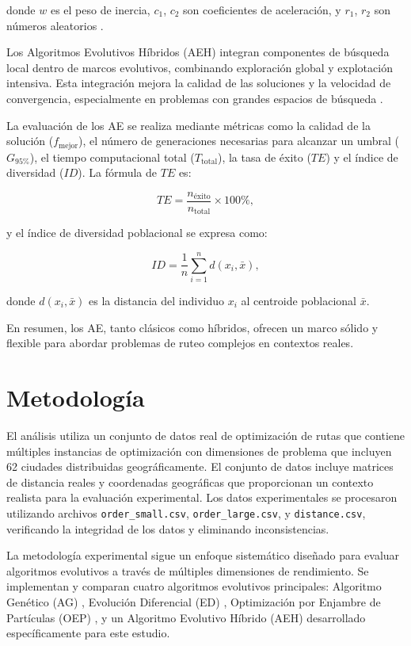 \documentclass[10pt,a4paper]{article}
\begin{document}
\begin{multicols}{2}
donde $w$ es el peso de inercia, $c_1$, $c_2$ son coeficientes de aceleración, y $r_1$, $r_2$ son números aleatorios \cite{clerc2002}.

Los Algoritmos Evolutivos Híbridos (AEH) integran componentes de búsqueda local dentro de marcos evolutivos, combinando exploración global y explotación intensiva. Esta integración mejora la calidad de las soluciones y la velocidad de convergencia, especialmente en problemas con grandes espacios de búsqueda \cite{alba2013}.

La evaluación de los AE se realiza mediante métricas como la calidad de la solución ($f_{\text{mejor}}$), el número de generaciones necesarias para alcanzar un umbral ($G_{95\%}$), el tiempo computacional total ($T_{\text{total}}$), la tasa de éxito ($TE$) y el índice de diversidad ($ID$). La fórmula de $TE$ es:

\begin{equation}
TE = \frac{n_{\text{éxito}}}{n_{\text{total}}} \times 100\%,
\end{equation}

y el índice de diversidad poblacional se expresa como:

\begin{equation}
ID = \frac{1}{n} \sum_{i=1}^{n} d(x_i, \bar{x}),
\end{equation}

donde $d(x_i, \bar{x})$ es la distancia del individuo $x_i$ al centroide poblacional $\bar{x}$.

En resumen, los AE, tanto clásicos como híbridos, ofrecen un marco sólido y flexible para abordar problemas de ruteo complejos en contextos reales.

\section{Metodología}

El análisis utiliza un conjunto de datos real de optimización de rutas que contiene múltiples instancias de optimización con dimensiones de problema que incluyen 62 ciudades distribuidas geográficamente. El conjunto de datos incluye matrices de distancia reales y coordenadas geográficas que proporcionan un contexto realista para la evaluación experimental. Los datos experimentales se procesaron utilizando archivos \texttt{order\_small.csv}, \texttt{order\_large.csv}, y \texttt{distance.csv}, verificando la integridad de los datos y eliminando inconsistencias.

La metodología experimental sigue un enfoque sistemático diseñado para evaluar algoritmos evolutivos a través de múltiples dimensiones de rendimiento. Se implementan y comparan cuatro algoritmos evolutivos principales: Algoritmo Genético (AG) \cite{back1996}, Evolución Diferencial (ED) \cite{das2011}, Optimización por Enjambre de Partículas (OEP) \cite{clerc2002}, y un Algoritmo Evolutivo Híbrido (AEH) desarrollado específicamente para este estudio.


\end{multicols}
\end{document}
